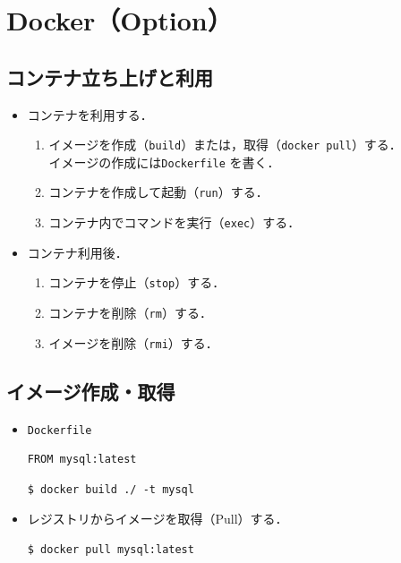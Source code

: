 \section{Docker（Option）}\label{chap:docker}
\tocc
\subsection{コンテナ立ち上げと利用}
\begin{frame}[t]{\ftitle}
    \begin{itemize}
        \setlength{\itemsep}{1em}
        \item コンテナを利用する．
              \begin{enumerate}
                  \setlength{\itemsep}{.5em}
                  \item イメージを作成（\texttt{build}）または，取得（\texttt{docker pull}）する．\\
                        イメージの作成には\texttt{Dockerfile} を書く．
                  \item コンテナを作成して起動（\texttt{run}）する．
                  \item コンテナ内でコマンドを実行（\texttt{exec}）する．
              \end{enumerate}
        \item コンテナ利用後．
              \begin{enumerate}
                  \setlength{\itemsep}{.5em}
                  \item コンテナを停止（\texttt{stop}）する．
                  \item コンテナを削除（\texttt{rm}）する．
                  \item イメージを削除（\texttt{rmi}）する．
              \end{enumerate}
    \end{itemize}
\end{frame}
\subsection{イメージ作成・取得}
\begin{frame}[containsverbatim,t]{\ftitle}
    \begin{itemize}
        \item \texttt{Dockerfile}
              \begin{lstlisting}[language=docker-compose-2]
FROM mysql:latest
            \end{lstlisting}
              \begin{lstlisting}[backgroundcolor={\color{black}},basicstyle={\color{white}\ttfamily\fontsize{12pt}{24pt}\selectfont},frame=none]
$ docker build ./ -t mysql
                            \end{lstlisting}
        \item レジストリからイメージを取得（Pull）する．
              \begin{lstlisting}[backgroundcolor={\color{black}},basicstyle={\color{white}\ttfamily\fontsize{12pt}{24pt}\selectfont},frame=none]
$ docker pull mysql:latest
            \end{lstlisting}
    \end{itemize}
\end{frame}
